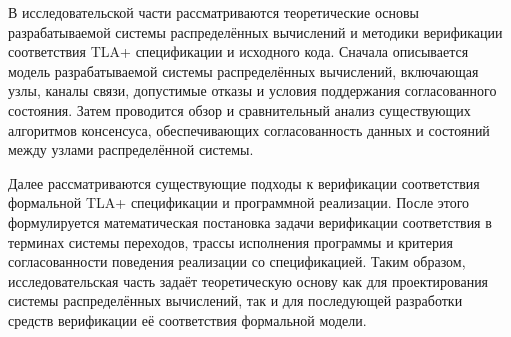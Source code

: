 
В исследовательской части рассматриваются теоретические основы разрабатываемой
системы распределённых вычислений и методики верификации соответствия TLA+
спецификации и исходного кода. Сначала описывается модель разрабатываемой
системы распределённых вычислений, включающая узлы, каналы связи, допустимые
отказы и условия поддержания согласованного состояния. Затем проводится обзор и
сравнительный анализ существующих алгоритмов консенсуса, обеспечивающих
согласованность данных и состояний между узлами распределённой системы.

Далее рассматриваются существующие подходы к верификации соответствия
формальной TLA+ спецификации и программной реализации. После этого
формулируется математическая постановка задачи верификации соответствия в
терминах системы переходов, трассы исполнения программы и критерия
согласованности поведения реализации со спецификацией. Таким образом,
исследовательская часть задаёт теоретическую основу как для проектирования
системы распределённых вычислений, так и для последующей разработки средств
верификации её соответствия формальной модели.
